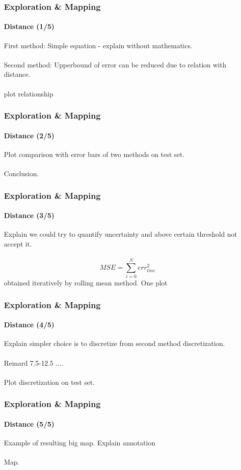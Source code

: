 \documentclass[10pt]{beamer}
\begin{document}
\begin{frame}
\frametitle{Exploration \& Mapping}
\framesubtitle{Distance (1/5)}
First method: Simple equation - explain without mathematics.\\~\\
Second method: Upperbound of error can be reduced due to relation with distance.\\~\\
plot relationship
\end{frame}


\begin{frame}
\frametitle{Exploration \& Mapping}
\framesubtitle{Distance (2/5)}
Plot comparison with error bars of two methods on test set.\\~\\
Conclusion.
\end{frame}


\begin{frame}
\frametitle{Exploration \& Mapping}
\framesubtitle{Distance (3/5)}
Explain we could try to quantify uncertainty and above certain threshold not accept it.\\~\\
$$
	MSE = \sum_{i=0}^N err_{line}^2
$$
obtained iteratively by rolling mean method.
One plot 
\end{frame}


\begin{frame}
\frametitle{Exploration \& Mapping}
\framesubtitle{Distance (4/5)}
Explain simpler choice is to discretize from second method discretization.\\~\\
Remard 7.5-12.5 ....\\~\\
Plot discretization on test set.
\end{frame}


\begin{frame}
\frametitle{Exploration \& Mapping}
\framesubtitle{Distance (5/5)}
Example of resulting big map. Explain annotation\\~\\
Map.
\end{frame}
\end{document}
